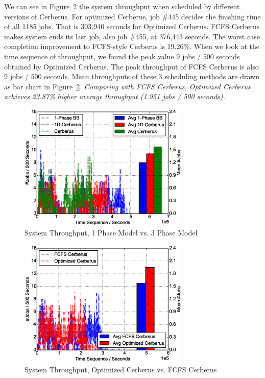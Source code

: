 We can see in Figure~\ref{Fig:DPvsFIFOThroughput} the system throughput
when scheduled by different versions of Cerberus.
For optimized Cerberus, job \#445 decides the finishing time of all 1185 jobs.
That is 303,940 seconds for Optimized Cerberus.
FCFS Cerberus makes system ends its last job, also job \#455, at 376,443 seconds.
The worst case completion improvement to FCFS-style Cerberus is 19.26\%.
When we look at the time sequence of throughput,
we found the peak value 9 jobs / 500 seconds obtained by Optimized Cerberus.
The peak throughput of FCFS Cerberus is also 9 jobs / 500 seconds.
Mean throughputs of these 3 scheduling methods are drawn
as bar chart in Figure~\ref{Fig:DPvsFIFOThroughput}.
\textit{Comparing with FCFS Cerberus, Optimized Cerberus achieves
23.87\% higher average throughput (1.951 jobs / 500 seconds).}

\begin{figure}[!t]
        \centering
        \includegraphics[width=3.2in]{3Pvs1PFigures/1000jobs_3p_vs_1p_throughput}
        \caption{System Throughput, 1 Phase Model vs. 3 Phase Model}
        \label{Fig:3Pvs1PThroughput}
\end{figure}


\begin{figure}[!t]
        \centering
        \includegraphics[width=3.2in]{DPvsFIFOFigures/1000jobs_dp_vs_fifo_throughput}
        \caption{System Throughput, Optimized Cerberus vs. FCFS Cerberus}
        \label{Fig:DPvsFIFOThroughput}
\end{figure}

